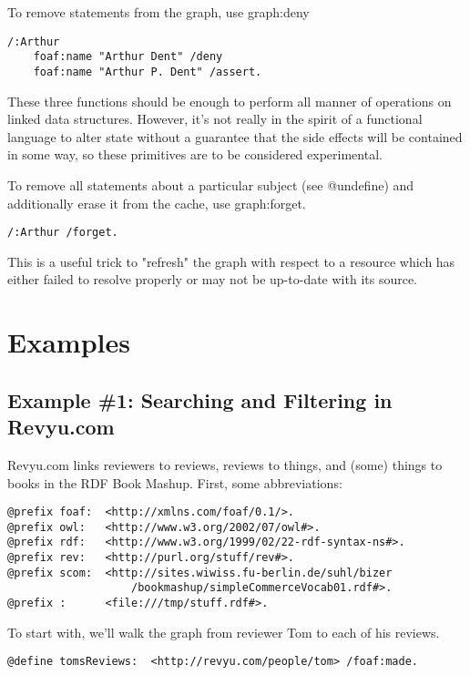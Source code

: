 \documentclass[runningheads]{llncs}
\begin{document}
To remove statements from the graph, use graph:deny

\begin{verbatim}
/:Arthur
    foaf:name "Arthur Dent" /deny
    foaf:name "Arthur P. Dent" /assert.
\end{verbatim}

These three functions should be enough to perform all manner of operations on linked data structures.  However, it's not really in the spirit of a functional language to alter state without a guarantee that the side effects will be contained in some way, so these primitives are to be considered experimental.

To remove all statements about a particular subject (see @undefine) and additionally erase it from the cache, use graph:forget.

\begin{verbatim}
/:Arthur /forget.
\end{verbatim}

This is a useful trick to "refresh" the graph with respect to a resource which has either failed to resolve properly or may not be up-to-date with its source.

\section{Examples}

\subsection{Example \#1: Searching and Filtering in Revyu.com}

Revyu.com links reviewers to reviews, reviews to things, and (some) things to
books in the RDF Book Mashup.  First, some abbreviations:

\begin{verbatim}
@prefix foaf:  <http://xmlns.com/foaf/0.1/>.
@prefix owl:   <http://www.w3.org/2002/07/owl#>.
@prefix rdf:   <http://www.w3.org/1999/02/22-rdf-syntax-ns#>.
@prefix rev:   <http://purl.org/stuff/rev#>.
@prefix scom:  <http://sites.wiwiss.fu-berlin.de/suhl/bizer
                   /bookmashup/simpleCommerceVocab01.rdf#>.
@prefix :      <file:///tmp/stuff.rdf#>.
\end{verbatim}


To start with, we'll walk the graph from reviewer Tom to each of his reviews.

\begin{verbatim}
@define tomsReviews:  <http://revyu.com/people/tom> /foaf:made.
\end{verbatim}
\end{document}

